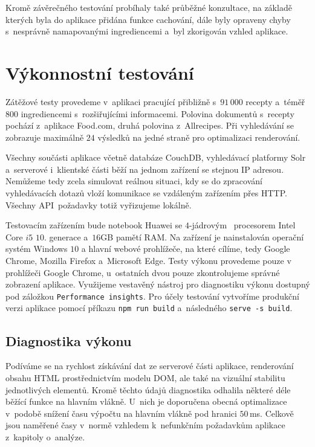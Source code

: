 Kromě závěrečného testování probíhaly také průběžné konzultace, na základě kterých byla do aplikace přidána funkce cachování, dále byly opraveny chyby s~nesprávně namapovanými ingrediencemi a~byl zkorigován vzhled aplikace.

\section{Výkonnostní testování}

Zátěžové testy provedeme v~aplikaci pracující přibližně s~$91\,000$ recepty a~té\-měř $800$ ingrediencemi s~rozšiřujícími informacemi. Polovina dokumentů s~recepty pochází z~aplikace Food.com, druhá polovina z~Allrecipes. Při vyhledávání se zobrazuje maximálně $24$ výsledků na jedné straně pro optimalizaci renderování.

Všechny součásti aplikace včetně databáze CouchDB, vyhledávací platformy Solr a~serverové i~klientské části běží na jednom zařízení se stejnou IP adresou. Nemůžeme tedy zcela simulovat reálnou situaci, kdy se do zpracování vyhledávacích dotazů vloží komunikace se vzdáleným zařízením přes HTTP. Všechny API~požadavky totiž vyřizujeme lokálně.

Testovacím zařízením bude notebook Huawei se $4$-jádrovým ~procesorem Intel Core $i5$ $10$. generace a~$16$GB pamětí RAM. Na zařízení je nainstalován operační systém Windows $10$ a hlavní webové prohlížeče, na které cílíme, tedy Google Chrome, Mozilla Firefox a~Microsoft Edge. Testy výkonu provedeme pouze v prohlížeči Google Chrome, u~ostatních dvou pouze zkontrolujeme správné zobrazení aplikace. Využijeme vestavěný nástroj pro diagnostiku výkonu dostupný pod záložkou \texttt{Performance insights}. Pro účely testování vytvoříme produkční verzi aplikace pomocí příkazu \texttt{npm\,run\,build} a~následného \texttt{serve\,-s\,build}.

\subsection{Diagnostika výkonu}

Podíváme se na rychlost získávání dat ze serverové části aplikace, renderování obsahu HTML prostřednictvím modelu DOM, ale také na vizuální stabilitu jednotlivých elementů. Kromě těchto údajů diagnostika odhalila některé déle běžící funkce na hlavním vlákně. U~nich je doporučena obecná optimalizace v~podobě snížení času výpočtu na hlavním vlákně pod hranici $50\,$ms. Celkově jsou naměřené časy v~normě vzhledem k~nefunkčním požadavkům aplikace z~kapitoly o~analýze.


